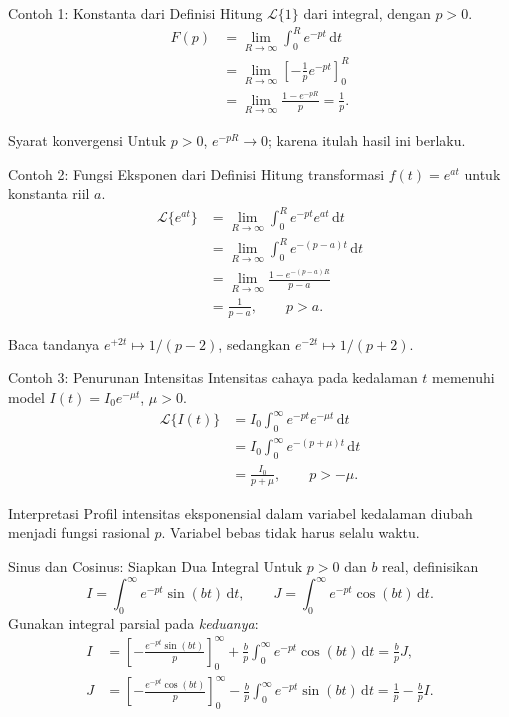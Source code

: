 \documentclass[aspectratio=169,11pt]{beamer}
\newcommand{\Lap}{\mathcal{L}}
\newcommand{\dd}{\,\mathrm{d}}
\begin{document}
\begin{frame}{Contoh 1: Konstanta dari Definisi}
Hitung $\Lap\{1\}$ dari integral, dengan $p>0$.
\begin{align*}
F(p)&=\lim_{R\to\infty}\int_0^R e^{-pt}\dd t\\
&=\lim_{R\to\infty}\left[-\frac{1}{p}e^{-pt}\right]_0^R\\
&=\lim_{R\to\infty}\frac{1-e^{-pR}}{p}
=\boxed{\frac{1}{p}}.
\end{align*}
\begin{alertblock}{Syarat konvergensi}
Untuk $p>0$, $e^{-pR}\to0$; karena itulah hasil ini berlaku.
\end{alertblock}
\end{frame}

\begin{frame}{Contoh 2: Fungsi Eksponen dari Definisi}
Hitung transformasi $f(t)=e^{at}$ untuk konstanta riil $a$.
\begin{align*}
\Lap\{e^{at}\}
&=\lim_{R\to\infty}\int_0^R e^{-pt}e^{at}\dd t\\
&=\lim_{R\to\infty}\int_0^R e^{-(p-a)t}\dd t\\
&=\lim_{R\to\infty}\frac{1-e^{-(p-a)R}}{p-a}\\
&=\boxed{\frac{1}{p-a}},\qquad p>a.
\end{align*}
\begin{exampleblock}{Baca tandanya}
$e^{+2t}\mapsto 1/(p-2)$, sedangkan $e^{-2t}\mapsto 1/(p+2)$.
\end{exampleblock}
\end{frame}

\begin{frame}{Contoh 3: Penurunan Intensitas}
Intensitas cahaya pada kedalaman $t$ memenuhi model $I(t)=I_0e^{-\mu t}$, $\mu>0$.
\[
\begin{aligned}
\Lap\{I(t)\}
&=I_0\int_0^\infty e^{-pt}e^{-\mu t}\dd t\\
&=I_0\int_0^\infty e^{-(p+\mu)t}\dd t\\
&=\boxed{\frac{I_0}{p+\mu}},\qquad p>-\mu.
\end{aligned}
\]
\begin{block}{Interpretasi}
Profil intensitas eksponensial dalam variabel kedalaman diubah menjadi fungsi rasional $p$. Variabel bebas tidak harus selalu waktu.
\end{block}
\end{frame}

\begin{frame}{Sinus dan Cosinus: Siapkan Dua Integral}
Untuk $p>0$ dan $b$ real, definisikan
\[
I=\int_0^\infty e^{-pt}\sin(bt)\dd t,
\qquad J=\int_0^\infty e^{-pt}\cos(bt)\dd t.
\]
Gunakan integral parsial pada \emph{keduanya}:
\begin{align*}
I&=\left[-\frac{e^{-pt}\sin(bt)}p\right]_0^\infty
 +\frac bp\int_0^\infty e^{-pt}\cos(bt)\dd t
 =\frac bp J,\\[1mm]
J&=\left[-\frac{e^{-pt}\cos(bt)}p\right]_0^\infty
 -\frac bp\int_0^\infty e^{-pt}\sin(bt)\dd t
 =\frac1p-\frac bp I.
\end{align*}
\end{frame}
\end{document}
